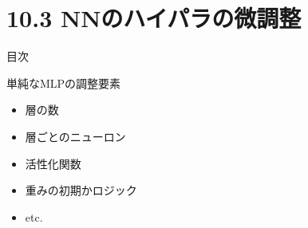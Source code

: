 \documentclass[aspectratio=169, dvipdfmx, 14pt, xcolor={svgnames,dvipsnames}]{beamer}
\def\tightlist{\itemsep1pt\parskip0pt\parsep0pt}
\begin{document}
\begin{frame}{}

\end{frame}


\hypertarget{nnux306eux30cfux30a4ux30d1ux30e9ux306eux5faeux8abfux6574}{%
  \section{10.3
    NNのハイパラの微調整}\label{nnux306eux30cfux30a4ux30d1ux30e9ux306eux5faeux8abfux6574}}
\begin{frame}{\quad 目次}
  \tableofcontents[currentsection]
\end{frame}


\begin{frame}{\quad 単純なMLPの調整要素}
  \begin{itemize}
    \item
          層の数
    \item
          層ごとのニューロン
    \item
          活性化関数
    \item
          重みの初期かロジック
    \item
          etc.
  \end{itemize}
\end{frame}

\end{document}
